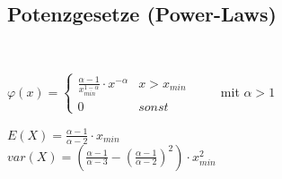   \subsection{Potenzgesetze (Power-Laws) }
    \\
    \begin{multicols}{2}
      $\varphi(x) = \begin{cases}
        \frac{\alpha - 1}{x_{min}^{1-\alpha}}\cdot x^{-\alpha} & x > x_{min} \\
        0 & sonst
      \end{cases} \qquad $ mit $\alpha > 1$\\
    \columnbreak
    
      $E(X) = \frac{\alpha - 1}{\alpha - 2} \cdot x_{min}$\\
      $var(X) = \left(\frac{\alpha - 1}{\alpha - 3} - \left(\frac{\alpha -1}{\alpha -2}\right)^2\right)\cdot x_{min}^2$
		\end{multicols}